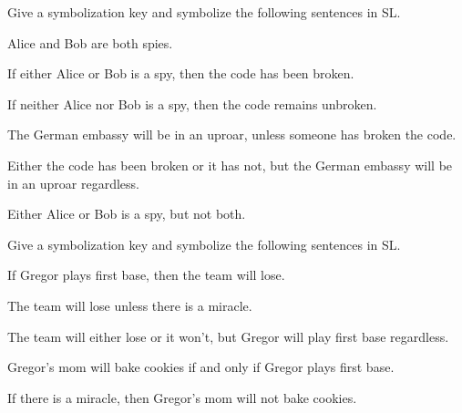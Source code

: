 \noindent\problempart
\label{pr.spies}
Give a symbolization key and symbolize the following sentences in SL. \\
\begin{exercises}
\item Alice and Bob are both spies. 
\item If either Alice or Bob is a spy, then the code has been broken. 
\item If neither Alice nor Bob is a spy, then the code remains unbroken. 
\item The German embassy will be in an uproar, unless someone has broken the code. 
\item Either the code has been broken or it has not, but the German embassy will be in an uproar regardless. 
\item Either Alice or Bob is a spy, but not both. 
\end{exercises}


\noindent\problempart Give a symbolization key and symbolize the following sentences in SL.

\begin{exercises}
\item If Gregor plays first base, then the team will lose. %
\item The team will lose unless there is a miracle. %
\item The team will either lose or it won't, but Gregor will play first base regardless. %
\item Gregor's mom will bake cookies if and only if Gregor plays first base.%
\item If there is a miracle, then Gregor's mom will not bake cookies. %
\end{exercises}


